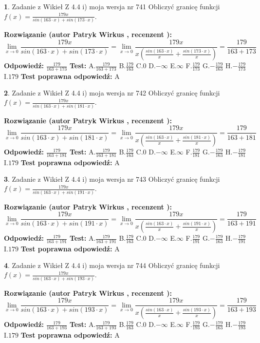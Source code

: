 \documentclass[12pt, a4paper]{article}
\theoremstyle{definition} %
\newtheorem{zad}{}
\newcommand{\zadStart}[1]{\begin{zad}#1\newline}
\newcommand{\zadStop}{\end{zad}}
\newcommand{\rozwStart}[2]{\noindent \textbf{Rozwiązanie (autor #1 , recenzent #2): }\newline}
\newcommand{\rozwStop}{\newline}
\newcommand{\odpStart}{\noindent \textbf{Odpowiedź:}\newline}
\newcommand{\odpStop}{\newline}
\newcommand{\testStart}{\noindent \textbf{Test:}\newline}
\newcommand{\testStop}{\newline}
\newcommand{\kluczStart}{\noindent \textbf{Test poprawna odpowiedź:}\newline}
\newcommand{\kluczStop}{\newline}
\begin{document}
\zadStart{Zadanie z Wikieł Z 4.4 i) moja wersja nr 741}
Obliczyć granicę funkcji $f(x)=\frac{179x}{sin(163\cdot x) +sin(173\cdot x)}$.
\zadStop
\rozwStart{Patryk Wirkus}{}
$$\lim\limits_{x\to 0}\frac{179x}{sin(163\cdot x) +sin(173\cdot x)}=\lim\limits_{x\to 0}\frac{179x}{x(\frac{sin(163\cdot x)}{x}+\frac{sin(173\cdot x)}{x})}=\frac{179}{163+173}$$
\rozwStop
\odpStart
$\frac{179}{163+173}$
\odpStop
\testStart
A.$\frac{179}{163+173}$
B.$\frac{179}{163}$
C.$0$
D.$-\infty$
E.$\infty$
F.$\frac{179}{173}$
G.$-\frac{179}{163}$
H.$-\frac{179}{173}$
I.$179$
\testStop
\kluczStart
A
\kluczStop



\zadStart{Zadanie z Wikieł Z 4.4 i) moja wersja nr 742}
Obliczyć granicę funkcji $f(x)=\frac{179x}{sin(163\cdot x) +sin(181\cdot x)}$.
\zadStop
\rozwStart{Patryk Wirkus}{}
$$\lim\limits_{x\to 0}\frac{179x}{sin(163\cdot x) +sin(181\cdot x)}=\lim\limits_{x\to 0}\frac{179x}{x(\frac{sin(163\cdot x)}{x}+\frac{sin(181\cdot x)}{x})}=\frac{179}{163+181}$$
\rozwStop
\odpStart
$\frac{179}{163+181}$
\odpStop
\testStart
A.$\frac{179}{163+181}$
B.$\frac{179}{163}$
C.$0$
D.$-\infty$
E.$\infty$
F.$\frac{179}{181}$
G.$-\frac{179}{163}$
H.$-\frac{179}{181}$
I.$179$
\testStop
\kluczStart
A
\kluczStop



\zadStart{Zadanie z Wikieł Z 4.4 i) moja wersja nr 743}
Obliczyć granicę funkcji $f(x)=\frac{179x}{sin(163\cdot x) +sin(191\cdot x)}$.
\zadStop
\rozwStart{Patryk Wirkus}{}
$$\lim\limits_{x\to 0}\frac{179x}{sin(163\cdot x) +sin(191\cdot x)}=\lim\limits_{x\to 0}\frac{179x}{x(\frac{sin(163\cdot x)}{x}+\frac{sin(191\cdot x)}{x})}=\frac{179}{163+191}$$
\rozwStop
\odpStart
$\frac{179}{163+191}$
\odpStop
\testStart
A.$\frac{179}{163+191}$
B.$\frac{179}{163}$
C.$0$
D.$-\infty$
E.$\infty$
F.$\frac{179}{191}$
G.$-\frac{179}{163}$
H.$-\frac{179}{191}$
I.$179$
\testStop
\kluczStart
A
\kluczStop



\zadStart{Zadanie z Wikieł Z 4.4 i) moja wersja nr 744}
Obliczyć granicę funkcji $f(x)=\frac{179x}{sin(163\cdot x) +sin(193\cdot x)}$.
\zadStop
\rozwStart{Patryk Wirkus}{}
$$\lim\limits_{x\to 0}\frac{179x}{sin(163\cdot x) +sin(193\cdot x)}=\lim\limits_{x\to 0}\frac{179x}{x(\frac{sin(163\cdot x)}{x}+\frac{sin(193\cdot x)}{x})}=\frac{179}{163+193}$$
\rozwStop
\odpStart
$\frac{179}{163+193}$
\odpStop
\testStart
A.$\frac{179}{163+193}$
B.$\frac{179}{163}$
C.$0$
D.$-\infty$
E.$\infty$
F.$\frac{179}{193}$
G.$-\frac{179}{163}$
H.$-\frac{179}{193}$
I.$179$
\testStop
\kluczStart
A
\kluczStop
\end{document}
